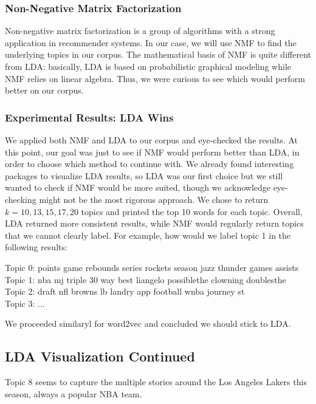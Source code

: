 \documentclass[11pt]{article}
\begin{document}
\subsubsection{Non-Negative Matrix Factorization}

Non-negative matrix factorization is a group of algorithms with a strong application in recommender
systems. In our case, we will use NMF to find the underlying topics in our corpus. The mathematical
basis of NMF is quite different from LDA: basically, LDA is based on probabilistic graphical modeling
while NMF relies on linear algebra. Thus, we were curious to see which would perform better on
our corpus.

\subsubsection{Experimental Results: LDA Wins}
We applied both NMF and LDA to our corpus and eye-checked the results. At this point, our goal
was just to see if NMF would perform better than LDA, in order to choose which method to
continue with. We already found interesting packages to visualize LDA results, so
LDA was our first choice but we still wanted to check if NMF would be more suited,
though we acknowledge eye-checking might not be the most rigorous approach.
We chose to return $k=10, 13, 15, 17, 20$ topics and printed the top 10 words for each topic.
Overall, LDA returned more consistent results, while NMF would regularly return topics that 
we cannot clearly label. For example, how would we label topic 1 in the following results:

\begin{ttfamily}
 Topic 0: points game rebounds series rockets season jazz thunder games assists\\
Topic 1: nba mj triple 30 way best liangelo possiblethe clowning doublesthe\\
Topic 2: draft nfl browns lb landry app football wnba journey st\\
Topic 3: ...
\end{ttfamily}

We proceeded similaryl for word2vec and concluded we should stick to LDA.

\subsection{LDA Visualization Continued}

Topic 8 seems to capture the multiple stories around the Los Angeles Lakers this season, always a popular NBA team. 
\end{document}
